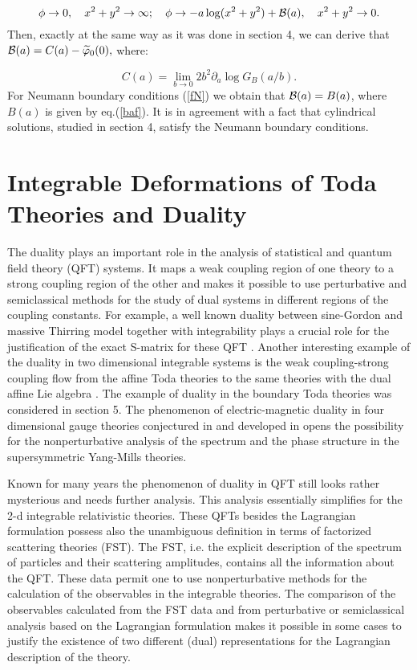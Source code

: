 \documentclass[a4paper,12pt]{article}
\begin{document}
\begin{equation}
\phi \rightarrow 0,\quad x^2+y^2\rightarrow \infty ;\quad \phi \rightarrow
-a\log (x^2+y^2)+{\cal B}(a),\quad x^2+y^2\rightarrow 0.  \label{ACN}
\end{equation}
Then, exactly at the same way as it was done in section 4, we can derive
that ${\cal B}(a)=C(a)-\widetilde{\varphi }_0(0),$ where:

\begin{equation}
C(a)=\lim_{b\rightarrow 0}2b^2\partial _a\log G_B(a/b).  \label{BAAS}
\end{equation}
For Neumann boundary conditions (\ref{fN}) we obtain that ${\cal B}(a)=B(a)$, 
where $B(a)$ is given by eq.(\ref{baf}). It is in agreement with a fact that
cylindrical solutions, studied in section 4, satisfy the Neumann boundary
conditions.

\section{Integrable Deformations of Toda Theories and Duality}

The duality plays an important role in the analysis of statistical and
quantum field theory (QFT) systems. It maps a weak coupling region of one
theory to a strong coupling region of the other and makes it possible to use
perturbative and semiclassical methods for the study of dual systems in
different regions of the coupling constants. For example, a well known
duality between sine-Gordon and massive Thirring model \cite{CM} together
with integrability plays a crucial role for the justification of the exact
S-matrix for these QFT . Another interesting example of the duality in two
dimensional integrable systems is the weak coupling-strong coupling flow
from the affine Toda theories to the same theories with the dual
affine Lie algebra \cite{CD}. The example of duality in the boundary Toda
theories was considered in section 5. The phenomenon of electric-magnetic
duality in four dimensional gauge theories conjectured in \cite{MNO} and
developed in \cite{SW} opens the possibility for the nonperturbative
analysis of the spectrum and the phase structure in the supersymmetric
Yang-Mills theories.

Known for many years the phenomenon of duality in QFT still looks rather
mysterious and needs further analysis. This analysis essentially simplifies
for the 2-d integrable relativistic theories. These QFTs besides the
Lagrangian formulation possess also the unambiguous definition in terms of
factorized scattering theories (FST). The FST, i.e. the explicit description
of the spectrum of particles and their scattering amplitudes, contains all
the information about the QFT. These data permit one to use nonperturbative
methods for the calculation of the observables in the integrable theories. The
comparison of the observables calculated from the FST data and from
perturbative or semiclassical analysis based on the Lagrangian formulation
makes it possible in some cases to justify the existence of two different
(dual) representations for the Lagrangian description of the theory.
\end{document}
